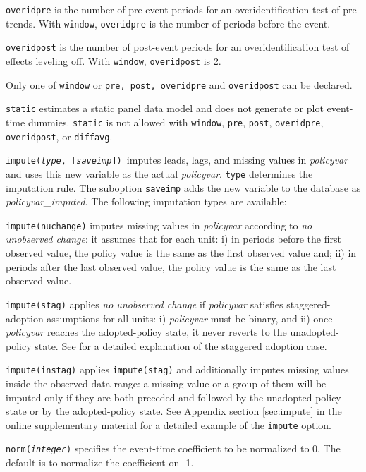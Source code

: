 \documentclass[12pt]{article}
\begin{document}
\morehangpara
{\tt overidpre} is the number of pre-event periods for an overidentification test of pre-trends. With {\tt window}, {\tt overidpre} is the number of periods before the event.

\morehangpara
{\tt overidpost} is the number of post-event periods for an overidentification test of effects leveling off. With {\tt window}, {\tt overidpost} is 2.

\hangpara
Only one of {\tt window} or {\tt pre, post, overidpre} and {\tt overidpost} can be declared.

\hangpara
{\tt static} estimates a static panel data model and does not generate or plot event-time dummies.
{\tt static} is not allowed with {\tt window}, {\tt pre}, {\tt post}, {\tt overidpre}, {\tt overidpost}, or {\tt diffavg}.

\hangpara
{\tt impute({\it type}, [{\it saveimp}]) }imputes leads, lags, and missing values in {\it policyvar} and uses this new variable as the actual {\it policyvar}.
{\tt type} determines the imputation rule. The suboption {\tt saveimp} adds the new variable to the database as {\it policyvar\_imputed}.
The following imputation types are available:

\morehangpara
{\tt impute(nuchange)} imputes missing values in {\it policyvar} according to {\it no unobserved change}: it assumes that for each unit: i) in periods before the first observed value, the policy value is the same as the first observed value and; ii) in periods after the last observed value, the policy value is the same as the last observed value.

\morehangpara
{\tt impute(stag)} applies {\it no unobserved change} if {\it policyvar} satisfies staggered-adoption assumptions for all units: i) {\it policyvar} must be binary, and ii) once {\it policyvar} reaches the adopted-policy state, it never reverts to the unadopted-policy state.
See \citet{freyaldenhoven2021visualizationforth} for a detailed explanation of the staggered adoption case.

\morehangpara
{\tt impute(instag)} applies {\tt impute(stag)} and additionally imputes missing values inside the observed data range: a missing value or a group of them will be imputed only if they are both preceded and followed by the unadopted-policy state or by the adopted-policy state.
See Appendix section \ref{sec:impute} in the online supplementary material for a detailed example of the {\tt impute} option.

\hangpara
{\tt norm({\it integer})} specifies the event-time coefficient to be normalized to 0. The default is to normalize the coefficient on -1.
\end{document}

